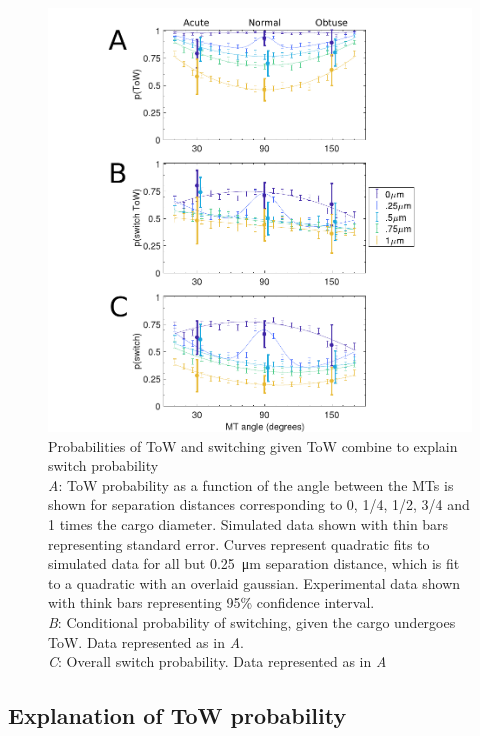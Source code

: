 \begin{figure}
\centering
\includegraphics[width=6.5in]{appendix1/probs}
\caption[Probabilities of ToW and switching given ToW combine to explain switch probability]{Probabilities of ToW and switching given ToW combine to explain switch probability\\
\textit{A}: ToW probability as a function of the angle between the MTs is shown for separation distances corresponding to 0, 1/4, 1/2, 3/4 and 1 times the cargo diameter. Simulated data shown with thin bars representing standard error. Curves represent quadratic fits to simulated data for all but \SI{.25}{\micro\meter} separation distance, which is fit to a quadratic with an overlaid gaussian. Experimental data shown with think bars representing 95\% confidence interval.\\
\textit{B}: Conditional probability of switching, given the cargo undergoes ToW. Data represented as in \textit{A}.\\
\textit{C}: Overall switch probability. Data represented as in \textit{A}}
\label{fig:fractions}
\end{figure}

\subsection{Explanation of ToW probability} \label{sec:ToW}

